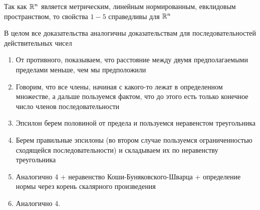 \begin{note}
	Так как $\mathbb{R}^n$ является метрическим, линейным нормированным,
	евклидовым пространством, то свойства $1-5$ справедливы для $\mathbb{R}^n$
\end{note}

\begin{idea}
	В целом все доказательства аналогичны доказательствам
	для последовательностей действительных чисел
	\begin{enumerate}
		\item От противного, показываем, что расстояние между
			двумя предполагаемыми пределами меньше, чем мы предположили
		\item Говорим, что все члены, начиная с какого-то лежат
			в определенном множестве, а дальше пользуемся фактом,
			что до этого есть только конечное число членов последовательности
		\item Эпсилон берем половиной от предела и пользуемся неравенстом
			треугольника
		\item Берем правильные эпсилоны (во втором случае пользуемся
			ограниченностью сходящейся последовательности) и складываем
			их по неравенству треугольника
		\item Аналогично 4 + неравенство Коши-Буняковского-Шварца +
			определение нормы через корень скалярного произведения
		\item Аналогично 4.
	\end{enumerate}
\end{idea}

